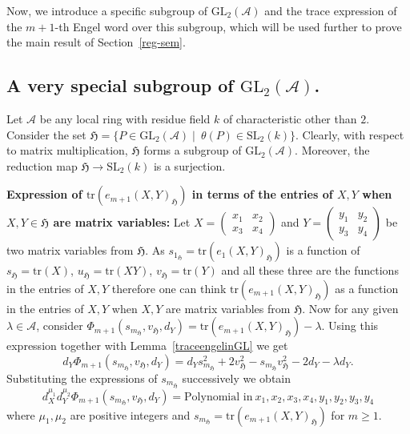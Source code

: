 \documentclass[10pt,twoside]{amsart}
\newcommand{\GL}{\mathrm{GL}}
\newcommand{\SL}{\mathrm{SL}}
\newcommand{\tr}{\mathrm{tr}}
\theoremstyle{definition}
\theoremstyle{definition}
\begin{document}
Now, we introduce a specific subgroup of $\GL_2(\mathcal{A})$ and the trace expression of the $m+1$-th Engel word over this subgroup, which will be used further to prove the main result of Section~\ref{reg-sem}. 

\subsection{A very special subgroup of $\GL_2(\mathcal{A})$.}{\label{trace in GL}} Let $\mathcal{A}$ be any local ring with residue field $k$ of characteristic other than $2$. Consider the set $\mathfrak{H}=\{P\in \GL_2(\mathcal{A})\mid\ \theta(P)\in \SL_2(k)\}$. Clearly, with respect to matrix multiplication, $\mathfrak{H}$ forms a subgroup of $\GL_2(\mathcal{A})$. Moreover, the reduction map $\mathfrak{H}\rightarrow \SL_2(k)$ is a surjection.

\noindent\textbf{Expression of $\tr(e_{m+1}(X,Y)_{\mathfrak{H}})$ in terms of the entries of $X,Y$ when $X,Y\in \mathfrak{H}$ are matrix variables:} Let $X=\left (\begin{array}{cc}
     x_1& x_2 \\
     x_3&x_4 
\end{array}\right )$ and $Y=\left (\begin{array}{cc}
     y_1&y_2  \\
     y_3&y_4 
\end{array}\right )$ be two matrix variables from $\mathfrak{H}$. As $s_{1_{\mathfrak{H}}}=\tr(e_1(X,Y)_{\mathfrak{H}})$ is a function of $s_{\mathfrak{H}}=\tr(X)$, $u_{\mathfrak{H}}=\tr(XY)$, $v_{\mathfrak{H}}=\tr(Y)$ and all these three are the functions in the entries of $X,Y$ therefore one can think $\tr(e_{m+1}(X,Y)_{\mathfrak{H}})$ as a function in the entries of $X,Y$ when $X,Y$ are matrix variables from $\mathfrak{H}$. Now for any given $\lambda\in \mathcal{A}$, consider  $\Phi_{m+1}(s_{m_{\mathfrak{H}}},v_{\mathfrak{H}}, d_{Y})=\tr(e_{m+1}(X,Y)_{\mathfrak{H}})-\lambda$. Using this expression together with Lemma~\ref{traceengelinGL} we get $$d_Y\Phi_{m+1}(s_{m_{\mathfrak{H}}},v_{\mathfrak{H}}, d_{Y})=d_Ys_{m_{\mathfrak{H}}}^2+2v_{\mathfrak{H}}^2-s_{m_{\mathfrak{H}}}v_{\mathfrak{H}}^2-2d_Y-\lambda d_Y.$$ Substituting the expressions of $s_{m_{\mathfrak{H}}}$ successively we obtain $$d_X^{\mu_1} d_Y^{\mu_2}\Phi_{m+1}(s_{m_{\mathfrak{H}}},v_{\mathfrak{H}}, d_{Y})=\text{Polynomial in}\ x_1,x_2,x_3,x_4,y_1,y_2,y_3,y_4$$ where $\mu_1,\mu_2$ are positive integers and $s_{m_{\mathfrak{H}}}=\tr(e_{m+1}(X,Y)_{\mathfrak{H}})$ for $m\geq 1$.
\end{document}
